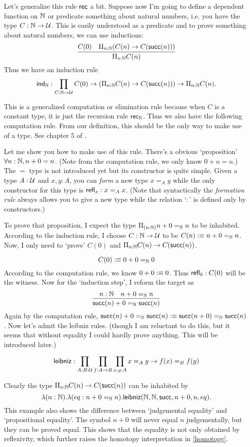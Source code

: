 Let's generalize this rule $\text{\sf rec}$ a bit. Suppose now I'm going to define
a dependent function on $\mathbb{N}$ or predicate something about natural numbers,
i.e. you have the type $C: \mathbb{N}\to\mathcal{U}$. This is easily understood as
a predicate and to prove something about natural numbers, we can use inductions:
$$
    \infer{\Pi_{n:\nat}C(n)}{C(0) & \Pi_{n:\nat}(C(n)\to C(\succn(n)))}
$$
\newcommand{\ind}{\name{ind}}
Thus we have an induction rule 
$$
\ind_\nat: \prod_{C:\nat\to\universe}C(0)
    \to(\Pi_{n:\nat}C(n)\to C(\succn(n)))
    \to\Pi_{n:\nat} C(n).
$$

This is a generalized computation or elimination rule because when
$C$ is a constant type, it is just the recursion rule $\text{\sf rec}_{\mathbb{N}}$. 
Thus we also have the following computation rule.
\eq{
    \ind_\nat(C,c_0,c_s,0) &\defn c_0 \\
    \ind_\nat(C,c_0,c_s,\succn(n)) &\defn c_s(n,\ind_\nat(C,c_0,c_s,n))
}
From our definition, this should be the only way to make use of a type.
See chapter 5 of \cite{homotopy-type-theory}. 

\newcommand{\refl}{\name{refl}}
Let me show you how to make use of this rule. There's a obvious `proposition'
$\forall n:\mathbb{N}, n + 0 = n$. (Note from the computation rule, we only know
$0+n=n$.) The $=$ type is not introduced yet but its constructor is quite 
simple. Given a type $A:\mathcal{U}$ and $x,y:A$, you can {\it form} a new 
type $x=_Ay$ while the only constructor for this type is $\refl_x: x=_Ax$. 
(Note that syntactically the {\it formation rule} always allows you to 
give a new type while the relation `$:$' is defined only by constructors.)

To prove that proposition, I expect the type $\Pi_{(n:\mathbb{N})}n+0 =_{\mathbb{N}} n$
to be inhabited. According to the induction rule, I choose $C: \mathbb{N}\to\mathcal{U}$
to be $C(n):\equiv n+0=_{\mathbb{N}} n$. 
Now, I only need to `prove' $C(0)$ and $\Pi_{n:\mathbb{N}}C(n)\to C(\text{\sf succ}(n))$.

$$
    C(0) :\equiv 0 + 0 =_{\mathbb{N}} 0
$$
According to the computation rule, we know $0 + 0:\equiv 0$. Thus
$\refl_0: C(0)$ will be the witness. Now for the `induction step',
I reform the target as
$$
\infer{\succn(n) + 0 =_\nat \succn(n)}{n:\nat & n+0=_\nat n}
$$
Again by the computation rule, 
$\text{\sf succ}(n) + 0 =_{\mathbb{N}} \text{\sf succ}(n):\equiv \text{\sf succ}(n+0)=_{\mathbb{N}}\text{\sf succ}(n)$. 
Now let's admit the leibniz rules. (though I am reluctant to do this, 
but it seems that without equality I could hardly prove anything. 
This will be introduced later.)

\begin{definition}
    \label{leibniz}
    $$
    \text{\sf leibniz}: \prod_{A,B:\mathcal{U}}\prod_{f:A\to B}\prod_{x,y:A}
        x=_Ay\to f(x)=_Bf(y)
    $$ 
\end{definition}
Clearly the type $\Pi_{n:\mathbb{N}}C(n)\to C(\text{\sf succ}(n))$ can be inhabited by
$$
    \lambda (n:\mathbb{N}).\lambda (eq:n+0=_{\mathbb{N}} n). \text{\sf leibniz}
    (\mathbb{N},\mathbb{N},\text{\sf succ},n+0,n,eq). 
$$
This example also shows the difference between `judgemental equality' 
and `propositional equality'. The symbol $n+0$ will never equal $n$
judgementally, but they can be proved equal. This shows that the equality
is not only obtained by reflexivity, which further raises the homotopy
interpretation in \autoref{homotopy}.


